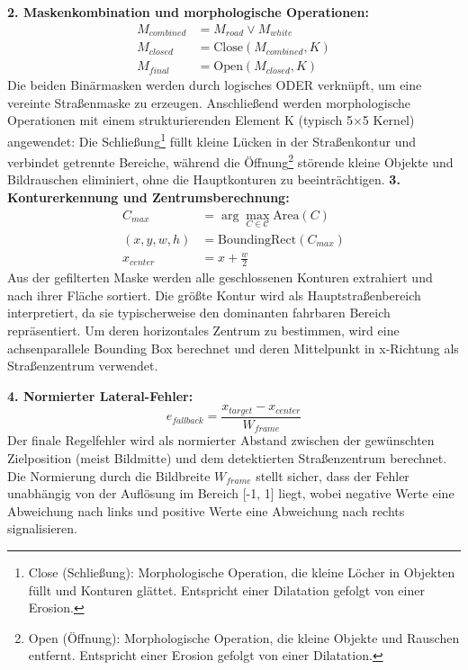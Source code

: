 \textbf{2. Maskenkombination und morphologische Operationen:}
\begin{align}
    M_{combined} &= M_{road} \vee M_{white} \\
    M_{closed} &= \text{Close}(M_{combined}, K) \\
    M_{final} &= \text{Open}(M_{closed}, K)
\end{align}
Die beiden Binärmasken werden durch logisches ODER verknüpft, um eine vereinte Straßenmaske zu erzeugen. 
Anschließend werden morphologische Operationen mit einem strukturierenden Element K (typisch 5×5 Kernel) 
angewendet: Die Schließung\footnote{Close (Schließung): Morphologische Operation, die kleine Löcher in Objekten füllt und Konturen glättet. Entspricht einer Dilatation gefolgt von einer Erosion.} füllt kleine Lücken in der Straßenkontur und verbindet getrennte Bereiche, 
während die Öffnung\footnote{Open (Öffnung): Morphologische Operation, die kleine Objekte und Rauschen entfernt. Entspricht einer Erosion gefolgt von einer Dilatation.} störende kleine Objekte und Bildrauschen eliminiert, ohne die 
Hauptkonturen zu beeinträchtigen.\newline
\textbf{3. Konturerkennung und Zentrumsberechnung:}
\begin{align}
    C_{max} &= \arg\max_{C \in \mathcal{C}} \text{Area}(C) \\
    (x, y, w, h) &= \text{BoundingRect}(C_{max}) \\
    x_{center} &= x + \frac{w}{2}
\end{align}
Aus der gefilterten Maske werden alle geschlossenen Konturen extrahiert und nach ihrer Fläche sortiert. 
Die größte Kontur wird als Hauptstraßenbereich interpretiert, da sie typischerweise den dominanten 
fahrbaren Bereich repräsentiert. Um deren horizontales Zentrum zu bestimmen, wird eine achsenparallele 
Bounding Box berechnet und deren Mittelpunkt in x-Richtung als Straßenzentrum verwendet.

\textbf{4. Normierter Lateral-Fehler:}
\begin{equation}
    e_{fallback} = \frac{x_{target} - x_{center}}{W_{frame}}
\end{equation}
Der finale Regelfehler wird als normierter Abstand zwischen der gewünschten Zielposition (meist Bildmitte) 
und dem detektierten Straßenzentrum berechnet. Die Normierung durch die Bildbreite $W_{frame}$ stellt 
sicher, dass der Fehler unabhängig von der Auflösung im Bereich [-1, 1] liegt, wobei negative Werte 
eine Abweichung nach links und positive Werte eine Abweichung nach rechts signalisieren.

